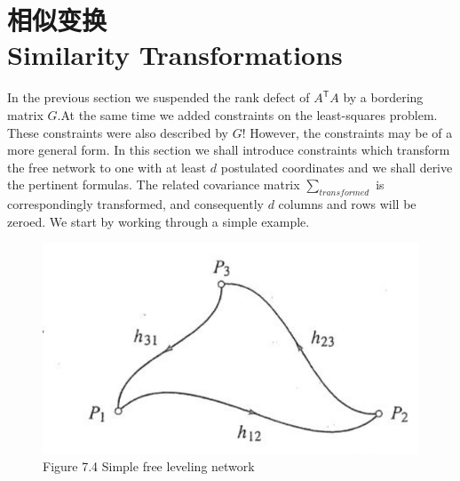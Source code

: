 \section[相似变换]{相似变换\\Similarity Transformations}	
\par\noindent
In the previous section we suspended the rank defect of $A^\mathsf{T}A$ by a bordering matrix $G$.At the same time we added constraints on the least-squares problem. These constraints
were also described by $G$! However, the constraints may be of a more general form. In this
section we shall introduce constraints which transform the free network to one with at least
$d$ postulated coordinates and we shall derive the pertinent formulas. The related covariance
matrix $\sum_{transformed}$ is correspondingly transformed, and consequently $d$ columns and rows will be zeroed. We start by working through a simple example.
\begin{figure}
	\centering
	\includegraphics[width=0.7\linewidth]{TeX_files/Part02/chapter07/image/7-4}
	\caption{Figure 7.4 Simple free leveling network}
	\label{fig:7-4}
\end{figure}

